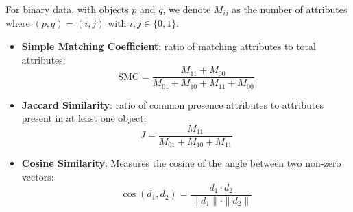For binary data, with objects $p$ and $q$, we denote $M_{ij}$ as the number of attributes where $(p,q) = (i,j)$ with $i,j \in \{0,1\}$.

\begin{itemize}
    \item \textbf{Simple Matching Coefficient}: ratio of matching attributes to total attributes:
    \begin{equation}
                \text{SMC} = \frac{M_{11} + M_{00}}{M_{01} + M_{10} + M_{11} + M_{00}}
    \end{equation}
    
    \item \textbf{Jaccard Similarity}: ratio of common presence attributes to attributes present in at least one object:
    \begin{equation}
        J = \frac{M_{11}}{M_{01} + M_{10} + M_{11}}        
    \end{equation}
    
    \item \textbf{Cosine Similarity}: Measures the cosine of the angle between two non-zero vectors:
    \begin{equation}
    \cos(d_1, d_2) = \frac{d_1 \cdot d_2}{\|d_1\| \cdot\|d_2\|}    
    \end{equation}
\end{itemize}